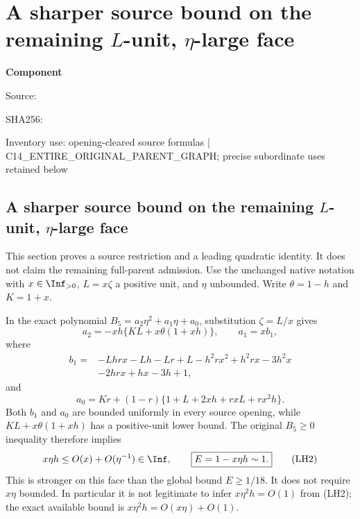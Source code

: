 \chapter{A sharper source bound on the remaining $L$-unit, $\eta$-large face}
\label{component:p57d751e20564}
\noindent\textbf{Component }\par
{\small\noindent Source: \par}
{\small\noindent SHA256: \par}
{\small\noindent Inventory use: opening-cleared source formulas | C14\_\allowbreak{}ENTIRE\_\allowbreak{}ORIGINAL\_\allowbreak{}PARENT\_\allowbreak{}GRAPH; precise subordinate uses retained below\par}
\medskip
\section[A sharper source bound on the L-unit, eta-large face]{A sharper source bound on the remaining $L$-unit, $\eta$-large face}
\label{p57d751e20564:sec:r7-c1-L-unit-eta-large-frontier}

This section proves a source restriction and a leading quadratic
identity.  It does not claim the remaining full-parent admission.
Use the unchanged native notation with $x\in\Inf_{>0}$,
$L=x\zeta$ a positive unit, and $\eta$ unbounded.  Write
$\theta=1-h$ and $K=1+x$.

In the exact polynomial $B_5=a_2\eta^2+a_1\eta+a_0$, substitution
$\zeta=L/x$ gives
\[
 a_2=-xh\{KL+x\theta(1+xh)\},\qquad a_1=xb_1,
                                                               \tag{LH1}
\]
where
\[
\begin{split}
 b_1={}&-Lhrx-Lh-Lr+L-h^2rx^2+h^2rx-3h^2x\\
       &-2hrx+hx-3h+1,
\end{split}
\]
and
\[
 a_0=Kr+(1-r)\{1+L+2xh+rxL+rx^2h\}.
\]
Both $b_1$ and $a_0$ are bounded uniformly in every source opening,
while $KL+x\theta(1+xh)$ has a positive-unit lower bound.
The original $B_5\ge0$ inequality therefore implies
\[
 x\eta h\le O(x)+O(\eta^{-1})\in\Inf,
 \qquad\boxed{E=1-x\eta h\sim1.}                       \tag{LH2}
\]
This is stronger on this face than the global bound $E\ge1/18$.
It does not require $x\eta$ bounded.  In particular it is not
legitimate to infer $x\eta^2h=O(1)$ from (LH2); the exact available
bound is $x\eta^2h=O(x\eta)+O(1)$.

